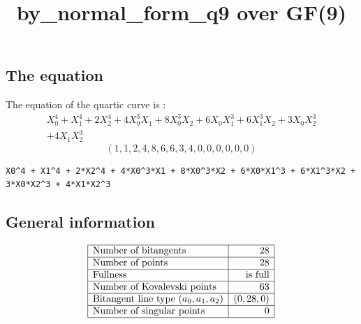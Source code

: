 \documentclass{article}
\newcommand\setTBstruts{\def\T{\rule{0pt}{2.6ex}}%
\def\B{\rule[-1.2ex]{0pt}{0pt}}}
\begin{document}
 
\setTBstruts



{\allowdisplaybreaks%






\title{by\_normal\_form\_q9 over GF(9)}
\author{}%
\maketitle%
%



\subsection*{The equation}
The equation of the quartic curve  is :
$$
\begin{array}{c}
X_0^4 + X_1^4 + 2X_2^4 + 4X_0^3X_1 + 8X_0^3X_2 + 6X_0X_1^3 + 6X_1^3X_2 + 3X_0X_2^3\\
 + 4X_1X_2^3\end{array}
$$
$$
( 1, 1, 2, 4, 8, 6, 6, 3, 4, 0, 0, 0, 0, 0, 0 )$$
\begin{verbatim}
X0^4 + X1^4 + 2*X2^4 + 4*X0^3*X1 + 8*X0^3*X2 + 6*X0*X1^3 + 6*X1^3*X2 + 3*X0*X2^3 + 4*X1*X2^3
\end{verbatim}
\subsection*{General information}
{\renewcommand{\arraystretch}{1.5}
$$
\begin{array}{|l|r|}
\hline
\mbox{Number of bitangents} & 28\\
\hline
\mbox{Number of points} & 28\\
\hline
\mbox{Fullness} &  \mbox{is full}\\
\hline
\mbox{Number of Kovalevski points} & 63\\
\hline
\mbox{Bitangent line type $(a_0,a_1,a_2)$} & (0,
28,
0)\\
\hline
\mbox{Number of singular points} & 0\\
\hline
\end{array}
$$}
}
\end{document}
